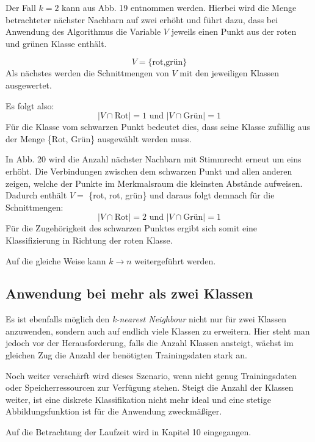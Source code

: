 \documentclass[fontsize=11pt]{scrartcl}
\begin{document}
                
                Der Fall $k=2$ kann aus Abb. 19 entnommen werden. Hierbei wird die Menge betrachteter nächster Nachbarn auf zwei erhöht und führt dazu, dass bei Anwendung des Algorithmus die Variable $V$ jeweils einen Punkt aus der roten und grünen Klasse enthält.\par
                $$
                    V=\{\text{rot,grün}\}
                $$ 
                Als nächstes werden die Schnittmengen von $V$ mit den jeweiligen Klassen ausgewertet.\par 
                Es folgt also:
                $$
                    |V \cap \text{Rot}| = 1 \text{ und } | V \cap \text{Grün} | = 1
                $$
               	Für die Klasse vom schwarzen Punkt bedeutet dies, dass seine Klasse zufällig aus der Menge \{Rot, Grün\} ausgewählt werden muss.       
                \par
            	In Abb. 20 wird die Anzahl nächster Nachbarn mit Stimmrecht erneut um eins erhöht. Die Verbindungen zwischen dem schwarzen Punkt und allen anderen zeigen, welche der Punkte im Merkmalsraum die kleinsten Abstände aufweisen. Dadurch enthält $V=$ \{rot, rot, grün\} und daraus folgt demnach für die Schnittmengen:
                $$
                    |V \cap \text{Rot} | = 2 \text{ und } | V \cap \text{Grün} | = 1
                $$
            	Für die Zugehörigkeit des schwarzen Punktes ergibt sich somit eine Klassifizierung in Richtung der roten Klasse.
            	
            	Auf die gleiche Weise kann $k \rightarrow n$ weitergeführt werden.
                        
            \subsection{Anwendung bei mehr als zwei Klassen}
                Es ist ebenfalls möglich den \emph{k-nearest Neighbour} nicht nur für zwei Klassen anzuwenden, sondern auch auf endlich viele Klassen zu erweitern. Hier steht man jedoch vor der Herausforderung, falls die Anzahl Klassen ansteigt, wächst im gleichen Zug die Anzahl der benötigten Trainingsdaten stark an.\cite{ertel2016_p211}\par
                Noch weiter verschärft wird dieses Szenario, wenn nicht genug Trainingsdaten oder Speicherressourcen zur Verfügung stehen. 
                Steigt die Anzahl der Klassen weiter, ist eine diskrete Klassifikation nicht mehr ideal und eine stetige Abbildungsfunktion ist für die Anwendung zweckmäßiger.\cite{ertel2016_p211}
                \par
                Auf die Betrachtung der Laufzeit wird in Kapitel 10 eingegangen.
                
\end{document}
